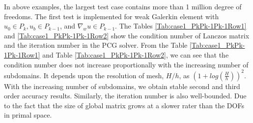 		In above examples, the largest test case contains more than 1 million degree of freedoms. 
		The first test is implemented for weak Galerkin element with $ u_0 \in P_k, u_b \in P_{k - 1} $, and $ \nabla_w u \in P_{k - 1} $. The Tables \ref{Tab:case1_PkPk-1Pk-1Row1} and \ref{Tab:case1_PkPk-1Pk-1Row2} show the condition number of Lanczos matrix and the iteration number in the PCG solver. From the Table \ref{Tab:case1_PkPk-1Pk-1Row1} and Table \ref{Tab:case1_PkPk-1Pk-1Row2}, we can see that the condition number does not increase proportionally with the increasing number of subdomains. It depends upon the resolution of mesh, $ H/h $, as $ (1 + log(\frac{H}{h}))^{2} $. With the increasing number of subdomains, we obtain stable second and third order accuracy results. Similarly, the iteration number is also well-bounded. Due to the fact that the size of global matrix grows at a slower rater than the DOFs in primal space.
		
		
		
